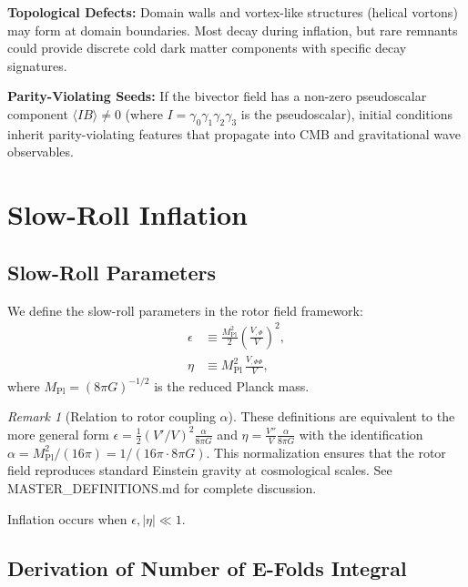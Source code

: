 \documentclass[11pt,a4paper]{article}
\numberwithin{equation}{section}
\theoremstyle{plain}
\theoremstyle{definition}
\theoremstyle{remark}
\newtheorem{remark}[theorem]{Remark}
\begin{document}
\textbf{Topological Defects:} Domain walls and vortex-like structures (helical vortons) may form at domain boundaries. Most decay during inflation, but rare remnants could provide discrete cold dark matter components with specific decay signatures.

\textbf{Parity-Violating Seeds:} If the bivector field has a non-zero pseudoscalar component $\langle I B \rangle \neq 0$ (where $I = \gamma_0\gamma_1\gamma_2\gamma_3$ is the pseudoscalar), initial conditions inherit parity-violating features that propagate into CMB and gravitational wave observables.

\section{Slow-Roll Inflation}
\label{sec:slowroll}

\subsection{Slow-Roll Parameters}

We define the slow-roll parameters in the rotor field framework:
\begin{align}
\epsilon &\equiv \frac{M_{\mathrm{Pl}}^2}{2}\left(\frac{V_{,\Phi}}{V}\right)^2,\label{eq:epsilon}\\
\eta &\equiv M_{\mathrm{Pl}}^2\,\frac{V_{,\Phi\Phi}}{V},\label{eq:eta}
\end{align}
where $M_{\mathrm{Pl}} = (8\pi G)^{-1/2}$ is the reduced Planck mass.

\begin{remark}[Relation to rotor coupling $\alpha$]
These definitions are equivalent to the more general form $\epsilon = \frac{1}{2}(V'/V)^2 \frac{\alpha}{8\pi G}$ and $\eta = \frac{V''}{V}\frac{\alpha}{8\pi G}$ with the identification $\alpha = M_{\mathrm{Pl}}^2/(16\pi) = 1/(16\pi \cdot 8\pi G)$. This normalization ensures that the rotor field reproduces standard Einstein gravity at cosmological scales. See MASTER\_DEFINITIONS.md for complete discussion.
\end{remark}

Inflation occurs when $\epsilon, |\eta| \ll 1$.

\subsection{Derivation of Number of E-Folds Integral}
\end{document}
